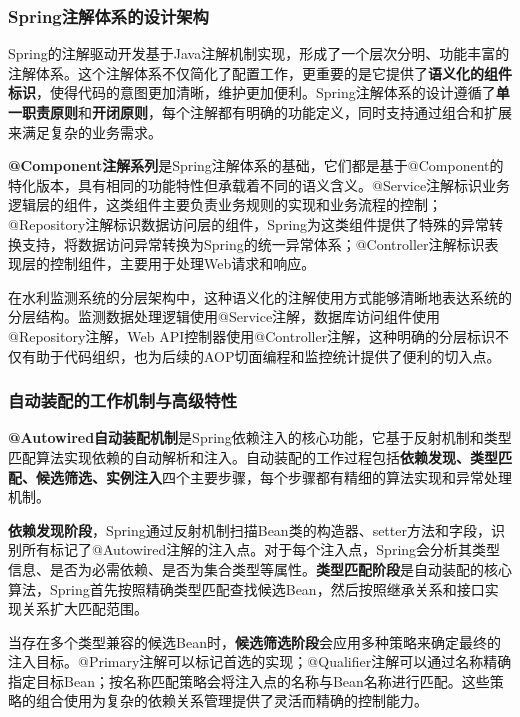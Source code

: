 \subsubsection{Spring注解体系的设计架构}\label{springux6ce8ux89e3ux4f53ux7cfbux7684ux8bbeux8ba1ux67b6ux6784}

Spring的注解驱动开发基于Java注解机制实现，形成了一个层次分明、功能丰富的注解体系。这个注解体系不仅简化了配置工作，更重要的是它提供了\textbf{语义化的组件标识}，使得代码的意图更加清晰，维护更加便利。Spring注解体系的设计遵循了\textbf{单一职责原则}和\textbf{开闭原则}，每个注解都有明确的功能定义，同时支持通过组合和扩展来满足复杂的业务需求。

\textbf{@Component注解系列}是Spring注解体系的基础，它们都是基于@Component的特化版本，具有相同的功能特性但承载着不同的语义含义。@Service注解标识业务逻辑层的组件，这类组件主要负责业务规则的实现和业务流程的控制；@Repository注解标识数据访问层的组件，Spring为这类组件提供了特殊的异常转换支持，将数据访问异常转换为Spring的统一异常体系；@Controller注解标识表现层的控制组件，主要用于处理Web请求和响应。

在水利监测系统的分层架构中，这种语义化的注解使用方式能够清晰地表达系统的分层结构。监测数据处理逻辑使用@Service注解，数据库访问组件使用@Repository注解，Web API控制器使用@Controller注解，这种明确的分层标识不仅有助于代码组织，也为后续的AOP切面编程和监控统计提供了便利的切入点。

\subsubsection{自动装配的工作机制与高级特性}\label{ux81eaux52a8ux88c5ux914dux7684ux5de5ux4f5cux673aux5236ux4e0eux9ad8ux7ea7ux7279ux6027}

\textbf{@Autowired自动装配机制}是Spring依赖注入的核心功能，它基于反射机制和类型匹配算法实现依赖的自动解析和注入。自动装配的工作过程包括\textbf{依赖发现、类型匹配、候选筛选、实例注入}四个主要步骤，每个步骤都有精细的算法实现和异常处理机制。

\textbf{依赖发现阶段}，Spring通过反射机制扫描Bean类的构造器、setter方法和字段，识别所有标记了@Autowired注解的注入点。对于每个注入点，Spring会分析其类型信息、是否为必需依赖、是否为集合类型等属性。\textbf{类型匹配阶段}是自动装配的核心算法，Spring首先按照精确类型匹配查找候选Bean，然后按照继承关系和接口实现关系扩大匹配范围。

当存在多个类型兼容的候选Bean时，\textbf{候选筛选阶段}会应用多种策略来确定最终的注入目标。@Primary注解可以标记首选的实现；@Qualifier注解可以通过名称精确指定目标Bean；按名称匹配策略会将注入点的名称与Bean名称进行匹配。这些策略的组合使用为复杂的依赖关系管理提供了灵活而精确的控制能力。

